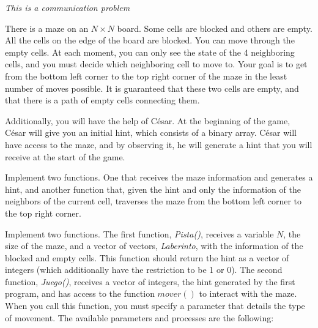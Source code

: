 \documentclass[12pt]{scrartcl}
\begin{document}
    
    {\itshape This is a communication problem}
    
    \vspace{10pt}

    There is a maze on an $N \times N$ board. Some cells are blocked and others are empty. All the cells on the edge of the board are blocked. You can move through the empty cells. At each moment, you can only see the state of the 4 neighboring cells, and you must decide which neighboring cell to move to. Your goal is to get from the bottom left corner to the top right corner of the maze in the least number of moves possible. It is guaranteed that these two cells are empty, and that there is a path of empty cells connecting them.

    Additionally, you will have the help of César. At the beginning of the game, César will give you an initial hint, which consists of a binary array. César will have access to the maze, and by observing it, he will generate a hint that you will receive at the start of the game.

    
    Implement two functions. One that receives the maze information and generates a hint, and another function that, given the hint and only the information of the neighbors of the current cell, traverses the maze from the bottom left corner to the top right corner.


    Implement two functions. The first function, \textit{Pista()}, receives a variable $N$, the size of the maze, and a vector of vectors, \textit{Laberinto}, with the information of the blocked and empty cells. This function should return the hint as a vector of integers (which additionally have the restriction to be 1 or 0). The second function, \textit{Juego()}, receives a vector of integers, the hint generated by the first program, and has access to the function $mover()$ to interact with the maze. When you call this function, you must specify a parameter that details the type of movement. The available parameters and processes are the following:
\end{document}
